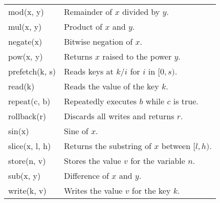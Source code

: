 \documentclass[../main.tex]{subfiles}
\begin{document}
\begin{table}[ht]
\begin{tabular}{l | l}
    mod(x, y)                & Remainder of $x$ divided by $y$.                                       \\
    mul(x, y)                & Product of $x$ and $y$.                                                \\
    negate(x)                & Bitwise negation of $x$.                                               \\
    pow(x, y)                & Returns $x$ raised to the power $y$.                                   \\
    prefetch(k, s)           & Reads keys at $k/i$ for $i$ in $[0, s)$.                               \\
    read(k)                  & Reads the value of the key $k$.                                        \\
    repeat(c, b)             & Repeatedly executes $b$ while $c$ is true.                             \\
    rollback(r)              & Discards all writes and returns $r$.                                   \\
    sin(x)                   & Sine of $x$.                                                           \\
    slice(x, l, h)           & Returns the substring of $x$ between $[l, h)$.                         \\
    store(n, v)              & Stores the value $v$ for the variable $n$.                             \\
    sub(x, y)                & Difference of $x$ and $y$.                                             \\
    write(k, v)              & Writes the value $v$ for the key $k$.                                  \\
  \end{tabular}
  \label{table:expressions}
\end{table}
\end{document}
